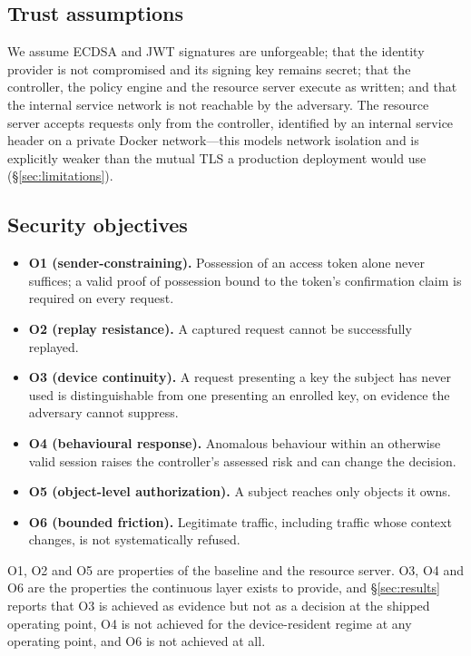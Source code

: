 \subsection{Trust assumptions}

We assume ECDSA and JWT signatures are unforgeable; that the identity provider is not compromised and its signing key remains secret; that the controller, the policy engine and the resource server execute as written; and that the internal service network is not reachable by the adversary. The resource server accepts requests only from the controller, identified by an internal service header on a private Docker network---this models network isolation and is explicitly weaker than the mutual TLS a production deployment would use (\S\ref{sec:limitations}).

\subsection{Security objectives}

\begin{itemize}
  \item \textbf{O1 (sender-constraining).} Possession of an access token alone never suffices; a valid proof of possession bound to the token's confirmation claim is required on every request.
  \item \textbf{O2 (replay resistance).} A captured request cannot be successfully replayed.
  \item \textbf{O3 (device continuity).} A request presenting a key the subject has never used is distinguishable from one presenting an enrolled key, on evidence the adversary cannot suppress.
  \item \textbf{O4 (behavioural response).} Anomalous behaviour within an otherwise valid session raises the controller's assessed risk and can change the decision.
  \item \textbf{O5 (object-level authorization).} A subject reaches only objects it owns.
  \item \textbf{O6 (bounded friction).} Legitimate traffic, including traffic whose context changes, is not systematically refused.
\end{itemize}

O1, O2 and O5 are properties of the baseline and the resource server. O3, O4 and O6 are the properties the continuous layer exists to provide, and \S\ref{sec:results} reports that O3 is achieved as evidence but not as a decision at the shipped operating point, O4 is not achieved for the device-resident regime at any operating point, and O6 is not achieved at all.


